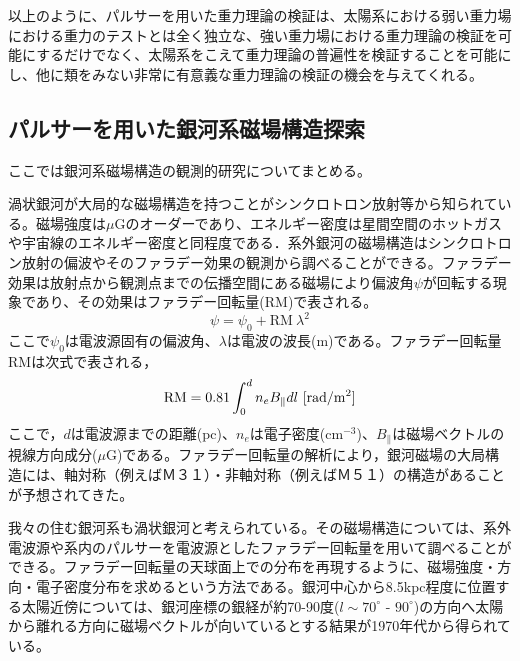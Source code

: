 以上のように、パルサーを用いた重力理論の検証は、太陽系における弱い重力場における重力のテストとは全く独立な、強い重力場における重力理論の検証を可能にするだけでなく、太陽系をこえて重力理論の普遍性を検証することを可能にし、他に類をみない非常に有意義な重力理論の検証の機会を与えてくれる。



\subsection{パルサーを用いた銀河系磁場構造探索}

ここでは銀河系磁場構造の観測的研究についてまとめる。

渦状銀河が大局的な磁場構造を持つことがシンクロトロン放射等から知られている。磁場強度は$\mu$Gのオーダーであり、エネルギー密度は星間空間のホットガスや宇宙線のエネルギー密度と同程度である．系外銀河の磁場構造はシンクロトロン放射の偏波やそのファラデー効果の観測から調べることができる。ファラデー効果は放射点から観測点までの伝播空間にある磁場により偏波角$\psi$が回転する現象であり、その効果はファラデー回転量(RM)で表される。
\begin{equation}
\psi = \psi_0 + \textrm{RM} ~ \lambda^2
\end{equation}
ここで$\psi_0$は電波源固有の偏波角、$\lambda$は電波の波長(m)である。ファラデー回転量RMは次式で表される，
\begin{equation}
\textrm{RM} = 0.81 \int_0^d n_e B_\parallel dl ~ [{\rm rad/m^2}]
\end{equation}
ここで，$d$は電波源までの距離(pc)、$n_e$は電子密度(cm$^{-3}$)、$B_\parallel$は磁場ベクトルの視線方向成分($\mu$G)である。ファラデー回転量の解析により，銀河磁場の大局構造には、軸対称（例えばＭ３１）・非軸対称（例えばＭ５１）の構造があることが予想されてきた。

我々の住む銀河系も渦状銀河と考えられている。その磁場構造については、系外電波源や系内のパルサーを電波源としたファラデー回転量を用いて調べることができる。ファラデー回転量の天球面上での分布を再現するように、磁場強度・方向・電子密度分布を求めるという方法である。銀河中心から8.5kpc程度に位置する太陽近傍については、銀河座標の銀経が約70-90度($l \sim 70^\circ$ - $90^\circ$)の方向へ太陽から離れる方向に磁場ベクトルが向いているとする結果が1970年代から得られている。

